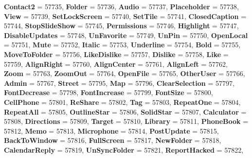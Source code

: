 \begin{DoxyCompactItemize}
{\bfseries Contact2} = 57735, 
{\bfseries Folder} = 57736, 
{\bfseries Audio} = 57737, 
{\bfseries Placeholder} = 57738, 
\newline
{\bfseries View} = 57739, 
{\bfseries Set\+Lock\+Screen} = 57740, 
{\bfseries Set\+Tile} = 57741, 
{\bfseries Closed\+Caption} = 57744, 
\newline
{\bfseries Stop\+Slide\+Show} = 57745, 
{\bfseries Permissions} = 57746, 
{\bfseries Highlight} = 57747, 
{\bfseries Disable\+Updates} = 57748, 
\newline
{\bfseries Un\+Favorite} = 57749, 
{\bfseries Un\+Pin} = 57750, 
{\bfseries Open\+Local} = 57751, 
{\bfseries Mute} = 57752, 
\newline
{\bfseries Italic} = 57753, 
{\bfseries Underline} = 57754, 
{\bfseries Bold} = 57755, 
{\bfseries Move\+To\+Folder} = 57756, 
\newline
{\bfseries Like\+Dislike} = 57757, 
{\bfseries Dislike} = 57758, 
{\bfseries Like} = 57759, 
{\bfseries Align\+Right} = 57760, 
\newline
{\bfseries Align\+Center} = 57761, 
{\bfseries Align\+Left} = 57762, 
{\bfseries Zoom} = 57763, 
{\bfseries Zoom\+Out} = 57764, 
\newline
{\bfseries Open\+File} = 57765, 
{\bfseries Other\+User} = 57766, 
{\bfseries Admin} = 57767, 
{\bfseries Street} = 57795, 
\newline
{\bfseries Map} = 57796, 
{\bfseries Clear\+Selection} = 57797, 
{\bfseries Font\+Decrease} = 57798, 
{\bfseries Font\+Increase} = 57799, 
\newline
{\bfseries Font\+Size} = 57800, 
{\bfseries Cell\+Phone} = 57801, 
{\bfseries Re\+Share} = 57802, 
{\bfseries Tag} = 57803, 
\newline
{\bfseries Repeat\+One} = 57804, 
{\bfseries Repeat\+All} = 57805, 
{\bfseries Outline\+Star} = 57806, 
{\bfseries Solid\+Star} = 57807, 
\newline
{\bfseries Calculator} = 57808, 
{\bfseries Directions} = 57809, 
{\bfseries Target} = 57810, 
{\bfseries Library} = 57811, 
\newline
{\bfseries Phone\+Book} = 57812, 
{\bfseries Memo} = 57813, 
{\bfseries Microphone} = 57814, 
{\bfseries Post\+Update} = 57815, 
\newline
{\bfseries Back\+To\+Window} = 57816, 
{\bfseries Full\+Screen} = 57817, 
{\bfseries New\+Folder} = 57818, 
{\bfseries Calendar\+Reply} = 57819, 
\newline
{\bfseries Un\+Sync\+Folder} = 57821, 
{\bfseries Report\+Hacked} = 57822, 

\end{DoxyCompactItemize}

